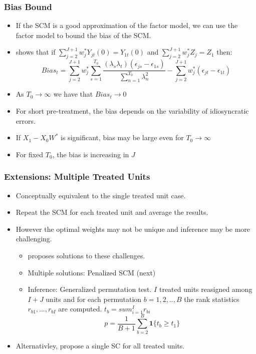 \documentclass[xcolor=svgnames,t]{beamer}
\newcommand{\myitem}{\item[$\circ$]}
\begin{document}
\begin{frame}
    \frametitle{Bias Bound}
    \begin{itemize}
        \item<1-> If the SCM is a good approximation of the factor model, we can use the factor model to bound the bias of the SCM.
        \item<2-> \cite{abadie2010synthetic} shows that if $\sum_{j=2}^{J+1} w^*_j Y_{jt}(0)=Y_{1t}(0)$ and $\sum_{j=2}^{J+1} w^*_j Z_j= Z_1$ then:
        $$ Bias_t =\sum_{j=2}^{J+1} w^*_j \sum^{T_0}_{s=1}\frac{(\lambda_s \lambda_t)(\epsilon_{js}-\epsilon_{1s})}{\sum^{T_0}_{n=1} \lambda^2_n} - \sum_{j=2}^{J+1} w^*_j(\epsilon_{jt}-\epsilon_{1t}) $$
        \item <3-> As $T_0\rightarrow \infty$ we have that $Bias_t \rightarrow 0$
        \item <4-> For short pre-treatment, the bias depends on the variability of idiosyncratic errors.
        \item <5-> If $X_1-X_0W^*$ is significant, bias may be large even for  $T_0\rightarrow \infty$ 
        \item <6-> For fixed $T_0$, the bias is increasing in $J$
    \end{itemize}
\end{frame}
\begin{frame}
    \frametitle{Extensions: Multiple Treated Units}
    \begin{itemize}
        \item <1-> Conceptually equivalent to the single treated unit case.
        \item <2-> Repeat the SCM for each treated unit and average the results.
        \item <3-> However the optimal weights may not be unique and inference may be more challenging.
        \begin{itemize}
            \myitem <4-> \cite{abadie2021penalized} proposes solutions to these challenges. 
            \myitem<5-> Multiple solutions: Penalized SCM (next)
        \myitem <6-> Inference: Generalized permutation test. $I$ treated units reasigned among $I+J$ units and for each permutation $b=1,2,..,B$ the rank statistics $r_{b1},...,r_{bI}$ are computed. $t_b=sum^I_{i=1}r_{bi}$
    $$p=\frac{1}{B+1} \sum^B_{b=2}\mathbf{1}\{t_b \geq t_1\} $$
        \end{itemize}
        
    \item <7-> Alternativley, \cite{robbins2017framework} propose a single SC for all treated units.
    \end{itemize}
    

\end{frame}
\end{document}
